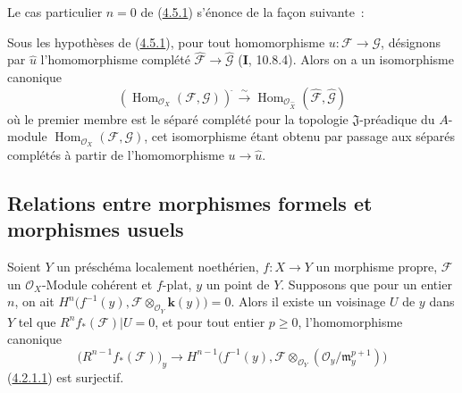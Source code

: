 Le cas particulier $n=0$ de (\hyperref[III.4.5.1-fr]{4.5.1}) s'énonce de la
façon suivante~:

\begin{corollary}[4.5.3]
\label{III.4.5.3-fr}
Sous les hypothèses de \textup{(\hyperref[III.4.5.1-fr]{4.5.1})}, pour tout
homomorphisme $u:\mathcal F\to\mathcal G$, désignons par
$\widehat u$ l'homomorphisme
complété $\widehat{\mathcal F}\to\widehat{\mathcal G}$ \textup{(\textbf{I}, 10.8.4)}. Alors on a un isomorphisme canonique
\[
\label{III.4.5.3.1-fr}
\left(\operatorname{Hom}_{\mathcal O_X}(\mathcal F,\mathcal G)\right)^{\widehat{\,}}
\xrightarrow{\sim}
\operatorname{Hom}_{\mathcal O_{\widehat X}}
(\widehat{\mathcal F},\widehat{\mathcal G})
\tag{4.5.3.1}
\]
où le premier membre est le séparé complété pour la topologie
$\mathfrak J$-préadique du $A$-module
$\operatorname{Hom}_{\mathcal O_X}(\mathcal F,\mathcal G)$, cet isomorphisme étant obtenu
par passage aux séparés complétés à partir de l'homomorphisme
$u\to\widehat u$.
\end{corollary}

\subsection{Relations entre morphismes formels et morphismes usuels}

\begin{proposition}[4.6.1]
\label{III.4.6.1-fr}
Soient $Y$ un préschéma localement noethérien, $f:X\to Y$ un morphisme
propre, $\mathcal F$ un $\mathcal O_X$-Module cohérent et $f$-plat, $y$ un
point de $Y$. Supposons que pour un
entier $n$, on ait
$H^n\bigl(f^{-1}(y),\mathcal F\otimes_{\mathcal O_Y}\boldsymbol{k}(y)\bigr)=0$.
Alors il existe un voisinage $U$ de $y$ dans $Y$ tel que
$R^nf_*(\mathcal F)|U=0$, et pour tout entier $p\geq0$, l'homomorphisme
canonique
\[
\bigl(R^{n-1}f_*(\mathcal F)\bigr)_y
\longrightarrow
H^{n-1}\bigl(f^{-1}(y),
\mathcal F\otimes_{\mathcal O_Y}
(\mathcal O_y/\mathfrak m_y^{p+1})\bigr)
\]
\textup{(\hyperref[III.4.2.1.1-fr]{4.2.1.1})} est surjectif.
\end{proposition}


